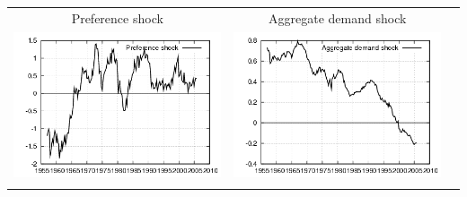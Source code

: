 \documentclass{beamer}
\begin{document}
{\begin{center}
\begin{tabular}{ccc}
  \small{Preference shock} & \small{Aggregate demand shock} & \\
  \includegraphics[scale=0.23]{plots2/cap_initre_prefsh.png} & \includegraphics[scale=0.23]{plots2/cap_initre_ADsh.png} & \\ \\
  \end{tabular}
  \end{center}
}
\end{document}
